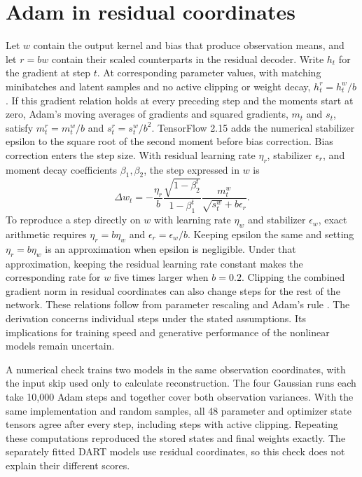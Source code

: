 \documentclass{article}
\begin{document}
\section{Adam in residual coordinates}
Let $w$ contain the output kernel and bias that produce observation means, and let $r=bw$ contain their scaled counterparts in the residual decoder. Write $h_t$ for the gradient at step $t$. At corresponding parameter values, with matching minibatches and latent samples and no active clipping or weight decay, $h_t^r=h_t^w/b$. If this gradient relation holds at every preceding step and the moments start at zero, Adam's moving averages of gradients and squared gradients, $m_t$ and $s_t$, satisfy $m_t^r=m_t^w/b$ and $s_t^r=s_t^w/b^2$. TensorFlow 2.15 adds the numerical stabilizer epsilon to the square root of the second moment before bias correction. Bias correction enters the step size. With residual learning rate $\eta_r$, stabilizer $\epsilon_r$, and moment decay coefficients $\beta_1,\beta_2$, the step expressed in $w$ is
\begin{equation}
\Delta w_t=-\frac{\eta_r}{b}\frac{\sqrt{1-\beta_2^t}}{1-\beta_1^t}
\frac{m_t^w}{\sqrt{s_t^w}+b\epsilon_r}.
\label{eq:adam_transport}
\end{equation}
To reproduce a step directly on $w$ with learning rate $\eta_w$ and stabilizer $\epsilon_w$, exact arithmetic requires $\eta_r=b\eta_w$ and $\epsilon_r=\epsilon_w/b$. Keeping epsilon the same and setting $\eta_r=b\eta_w$ is an approximation when epsilon is negligible. Under that approximation, keeping the residual learning rate constant makes the corresponding rate for $w$ five times larger when $b=0.2$. Clipping the combined gradient norm in residual coordinates can also change steps for the rest of the network. These relations follow from parameter rescaling and Adam's rule \citep{Dinh2017SharpMinima,KingmaBa2015Adam}. The derivation concerns individual steps under the stated assumptions. Its implications for training speed and generative performance of the nonlinear models remain uncertain.

A numerical check trains two models in the same observation coordinates, with the input skip used only to calculate reconstruction. The four Gaussian runs each take 10,000 Adam steps and together cover both observation variances. With the same implementation and random samples, all 48 parameter and optimizer state tensors agree after every step, including steps with active clipping. Repeating these computations reproduced the stored states and final weights exactly. The separately fitted DART models use residual coordinates, so this check does not explain their different scores.
\end{document}
